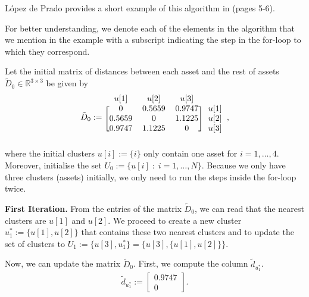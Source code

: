         López de Prado provides a short example of this algorithm in \cite{lopezmain} (pages 5-6).
        
        \begin{example}\label{example:treeclustering}
            For better understanding, we denote each of the elements in the algorithm that we mention in the example with a subscript indicating the step in the for-loop to which they correspond.
            
            Let the initial matrix of distances between each asset and the rest of assets $\tilde{D}_0 \in \mathbb{R}^{3 \times 3}$ be given by
            \begin{align*}
                \tilde{D}_0 := \begin{blockarray}{cccc}
                                    u[1] & u[2] & u[3] \\
                                        \begin{block}{[ccc]c}
                                          0 & 0.5659 & 0.9747 & u[1] \\
                                          0.5659 & 0 & 1.1225 & u[2] \\
                                          0.9747 & 1.1225 & 0 & u[3] \\
                                        \end{block}
                                \end{blockarray},
            \end{align*}
            where the initial clusters $u[i] := \{ i \}$ only contain one asset for $i=1, \dots, 4$. Moreover, initialise the set $U_0 := \{ u[i] \; : \; i=1, \dots, N \}$. Because we only have three clusters (assets) initially, we only need to run the steps inside the for-loop twice.
            
            \textbf{First Iteration.} From the entries of the matrix $\tilde{D}_0$, we can read that the nearest clusters are $u[1]$ and $u[2]$. We proceed to create a new cluster $u_1^* := \{ u[1], u[2] \}$ that contains these two nearest clusters and to update the set of clusters to $U_1 := \{ u[3], u_1^* \} = \{ u[3], \{ u[1], u[2] \} \}$.
            
            Now, we can update the matrix $\tilde{D}_0$. First, we compute the column $\tilde{d}_{u_1^*}$.
            \begin{align*}
                \tilde{d}_{u_1^*} := \begin{bmatrix}
                    0.9747 \\
                    0
                \end{bmatrix}.
            \end{align*}
            

\end{example}
